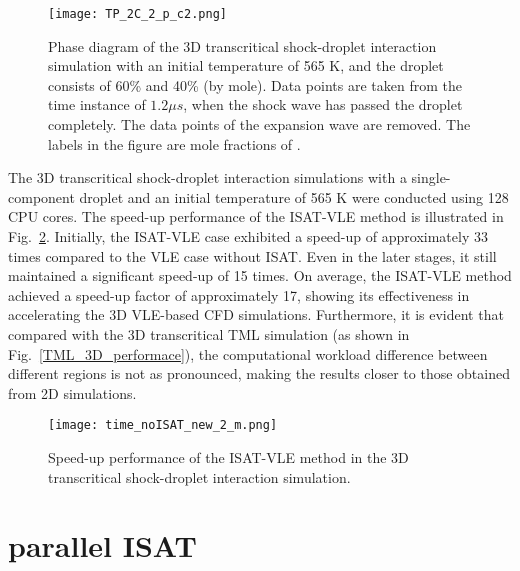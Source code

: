 \begin{figure}[htbp]
	\centering
	\texttt{[image: TP\_2C\_2\_p\_c2.png]}
	\caption{Phase diagram of the 3D transcritical shock-droplet interaction simulation with an initial temperature of 565 K, and the droplet consists of 60\%  and 40\%  (by mole). Data points are taken from the time instance of $1.2\mu s$, when the shock wave has passed the droplet completely. The data points of the expansion wave are removed. The labels in the figure are mole fractions of .}
	\label{droplet_3D_2C_phasediagram}
\end{figure}

The 3D transcritical shock-droplet interaction simulations with a single-component droplet and an initial temperature of 565 K were conducted using 128 CPU cores. The speed-up performance of the ISAT-VLE method is illustrated in Fig.~\ref{droplet_3D_perf}. Initially, the ISAT-VLE case exhibited a speed-up of approximately 33 times compared to the VLE case without ISAT. Even in the later stages, it still maintained a significant speed-up of 15 times. On average, the ISAT-VLE method achieved a speed-up factor of approximately 17, showing its effectiveness in accelerating the 3D VLE-based CFD simulations. Furthermore, it is evident that compared with the 3D transcritical TML simulation (as shown in Fig.~\ref{TML_3D_performace}), the computational workload difference between different regions is not as pronounced, making the results closer to those obtained from 2D simulations.


\begin{figure}[htbp]
	\centering
	\texttt{[image: time\_noISAT\_new\_2\_m.png]} 
	\caption{Speed-up performance of the ISAT-VLE method in the 3D transcritical shock-droplet interaction simulation.}
	\label{droplet_3D_perf}
\end{figure}

\section{parallel ISAT} \label{sec:pISAT}



